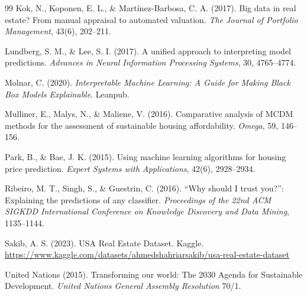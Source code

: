 \documentclass[12pt, a4paper]{article}
\begin{document}
\begin{thebibliography}{99}
Kok, N., Koponen, E. L., \& Mart{\'i}nez-Barbosa, C. A. (2017).
Big data in real estate? From manual appraisal to automated valuation.
\textit{The Journal of Portfolio Management}, 43(6), 202--211.

Lundberg, S. M., \& Lee, S. I. (2017).
A unified approach to interpreting model predictions.
\textit{Advances in Neural Information Processing Systems}, 30, 4765--4774.

Molnar, C. (2020).
\textit{Interpretable Machine Learning: A Guide for Making Black Box Models Explainable}.
Leanpub.

Mulliner, E., Malys, N., \& Maliene, V. (2016).
Comparative analysis of MCDM methods for the assessment of sustainable housing affordability.
\textit{Omega}, 59, 146--156.

Park, B., \& Bae, J. K. (2015).
Using machine learning algorithms for housing price prediction.
\textit{Expert Systems with Applications}, 42(6), 2928--2934.

Ribeiro, M. T., Singh, S., \& Guestrin, C. (2016).
``Why should I trust you?'': Explaining the predictions of any classifier.
\textit{Proceedings of the 22nd ACM SIGKDD International Conference on Knowledge Discovery and Data Mining}, 1135--1144.

Sakib, A. S. (2023).
USA Real Estate Dataset.
Kaggle. \url{https://www.kaggle.com/datasets/ahmedshahriarsakib/usa-real-estate-dataset}

United Nations (2015).
Transforming our world: The 2030 Agenda for Sustainable Development.
\textit{United Nations General Assembly Resolution} 70/1.

\end{thebibliography}
\endgroup
\end{document}
